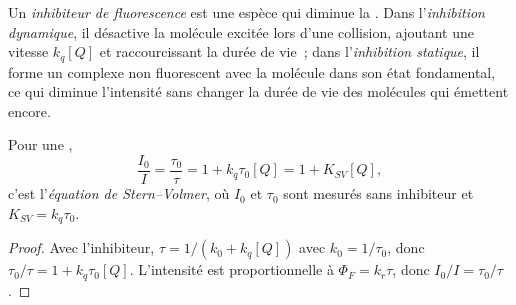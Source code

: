 \begin{definition}\label{def:b3:electronic-spectroscopy:quencher}
Un \emph{inhibiteur de fluorescence} est
une espèce qui diminue la . Dans l'\emph{inhibition
dynamique}, il désactive la molécule excitée
lors d'une collision, ajoutant une vitesse $k_q[Q]$ et raccourcissant la
durée de vie~; dans l'\emph{inhibition statique},
il forme un complexe non fluorescent avec la molécule dans son état
fondamental, ce qui diminue l'intensité sans changer la durée de vie des
molécules qui émettent encore.
\end{definition}

\begin{theorem}\label{thm:b3:electronic-spectroscopy:stern-volmer}
Pour une ,
\[
\frac{I_0}{I} = \frac{\tau_0}{\tau} = 1 + k_q\tau_0[Q] = 1 + K_{SV}[Q],
\]
c'est l'\emph{équation de Stern--Volmer}, où $I_0$ et $\tau_0$
sont mesurés sans inhibiteur et $K_{SV} = k_q\tau_0$.
\end{theorem}

\begin{proof}
Avec l'inhibiteur, $\tau = 1/(k_0 + k_q[Q])$ avec $k_0 = 1/\tau_0$, donc $\tau_0/\tau = 1 +
k_q\tau_0[Q]$. L'intensité est proportionnelle à $\Phi_F = k_r\tau$, donc $I_0/I = \tau_0/\tau$.
\end{proof}

